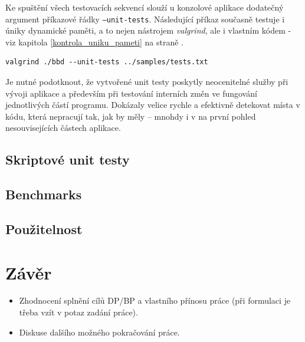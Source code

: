 \documentclass[11pt,twoside,a4paper]{book}
\begin{document}
Ke spuštění všech testovacích sekvencí slouží u konzolové aplikace dodatečný argument pří\-ka\-zo\-vé řádky \texttt{--unit-tests}. Následující příkaz současně testuje i úniky dynamické paměti, a to nejen nástrojem \textit{valgrind}, ale i vlastním kódem - viz kapitola \ref{kontrola_uniku_pameti} na straně \pageref{kontrola_uniku_pameti}.

\begin{verbatim}
valgrind ./bbd --unit-tests ../samples/tests.txt
\end{verbatim}

Je nutné podotknout, že vytvořené unit testy poskytly neocenitelné služby při vývoji aplikace a především při testování interních změn ve fungování jednotlivých částí programu. Dokázaly velice rychle a efektivně detekovat místa v kódu, která nepracují tak, jak by měly -- mnohdy i v na první pohled nesouvisejících částech aplikace.


\section{Skriptové unit testy}

\section{Benchmarks}

\section{Použitelnost}



\chapter{Závěr}

\begin{itemize}
\item Zhodnocení splnění cílů DP/BP a  vlastního přínosu práce (při formulaci je třeba vzít v potaz zadání práce).
\item Diskuse dalšího možného pokračování práce.
\end{itemize}



\end{document}

